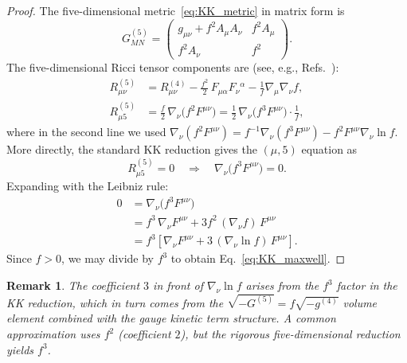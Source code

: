 \documentclass[letterpaper,twocolumn,superscriptaddress,longbibliography]{revtex4-2}
\newtheorem*{remark}{Remark}
\begin{document}
\begin{proof}
The five-dimensional metric~\eqref{eq:KK_metric} in matrix
form is
\begin{equation}
  G_{MN}^{(5)} =
  \begin{pmatrix}
    g_{\mu\nu} + f^2 A_\mu A_\nu & f^2 A_\mu \\
    f^2 A_\nu & f^2
  \end{pmatrix}.
  \label{eq:G5}
\end{equation}
The five-dimensional Ricci tensor components are
(see, e.g., Refs.~\cite{OverduinWesson1997,Wesson2006}):
\begin{align}
  R_{\mu\nu}^{(5)} &= R_{\mu\nu}^{(4)}
  - \frac{f^2}{2}\,F_{\mu\alpha}F_\nu{}^\alpha
  - \frac{1}{f}\nabla_\mu\nabla_\nu f,
  \label{eq:R5_munu} \\[4pt]
  R_{\mu 5}^{(5)} &= \frac{f}{2}\,\nabla_\nu\!\bigl(
  f^2 F^{\mu\nu}\bigr)
  = \frac{1}{2}\,\nabla_\nu\!\bigl(f^3 F^{\mu\nu}\bigr)
  \cdot\frac{1}{f},
  \label{eq:R5_mu5}
\end{align}
where in the second line we used
$\nabla_\nu(f^2 F^{\mu\nu})
= f^{-1}\nabla_\nu(f^3 F^{\mu\nu})
- f^2 F^{\mu\nu}\nabla_\nu\ln f$.
More directly, the standard KK reduction gives the
$(\mu,5)$ equation as~\cite{OverduinWesson1997}
\begin{equation}
  R_{\mu 5}^{(5)} = 0
  \quad\Longrightarrow\quad
  \nabla_\nu\!\bigl(f^3 F^{\mu\nu}\bigr) = 0.
  \label{eq:R5_mu5_eq}
\end{equation}
Expanding with the Leibniz rule:
\begin{align}
  0 &= \nabla_\nu\!\bigl(f^3 F^{\mu\nu}\bigr)
  \nonumber \\
  &= f^3\,\nabla_\nu F^{\mu\nu}
     + 3f^2\,(\nabla_\nu f)\,F^{\mu\nu}
  \nonumber \\
  &= f^3\!\left[\nabla_\nu F^{\mu\nu}
     + 3\,(\nabla_\nu\ln f)\,F^{\mu\nu}\right].
  \label{eq:leibniz}
\end{align}
Since $f > 0$, we may divide by $f^3$ to obtain
Eq.~\eqref{eq:KK_maxwell}.
\end{proof}

\begin{remark}
The coefficient $3$ in front of $\nabla_\nu\ln f$
arises from the $f^3$ factor in the KK reduction, which
in turn comes from the $\sqrt{-G^{(5)}} = f\sqrt{-g^{(4)}}$
volume element combined with the gauge kinetic term structure.
A common approximation uses $f^2$ (coefficient $2$),
but the rigorous five-dimensional reduction yields $f^3$.
\end{remark}
\end{document}
